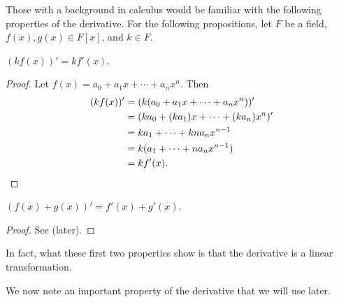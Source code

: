 Those with a background in calculus would be familiar with the following properties of the derivative. For the following propositions, let $F$ be a field, $f(x), g(x) \in F[x]$, and $k \in F$.

\begin{proposition}
    $(kf(x))' = kf'(x)$.
\end{proposition}
\begin{proof}
    Let $f(x) = a_0 + a_1x + \cdots + a_nx^n$. Then
    \begin{align*}
        (kf(x))' &= (k(a_0 + a_1x + \cdots + a_nx^n))'\\
        &= (ka_0 + (ka_1)x + \cdots + (ka_n)x^n)'\\
        &= ka_1 + \cdots + kna_nx^{n-1}\\
        &= k(a_1 + \cdots + na_nx^{n-1})\\
        &= kf'(x).\qedhere
    \end{align*}
\end{proof}

\begin{proposition}
    $(f(x) + g(x))' = f'(x) + g'(x)$.
\end{proposition}
\begin{proof}
    See  (later).
\end{proof}

\begin{remark}
    In fact, what these first two properties show is that the derivative is a linear transformation.
\end{remark}

We now note an important property of the derivative that we will use later.

